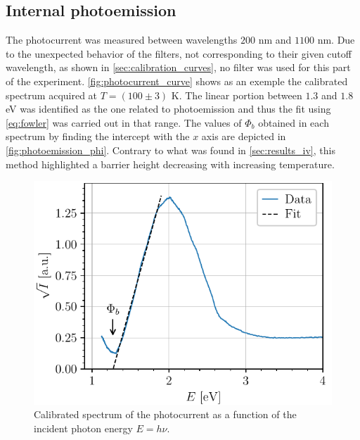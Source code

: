 \begin{figure}[htbp]
\begin{minipage}[t]{0.49\textwidth}
        \label{fig:richardson}
    \end{minipage}
\end{figure}

\subsection{Internal photoemission} \label{sec:results_photoemission}
The photocurrent was measured between wavelengths $200$ nm and $1100$ nm.
Due to the unexpected behavior of the filters, not corresponding to their given cutoff wavelength, as shown in \autoref{sec:calibration_curves}, no filter was used for this part of the experiment.
\autoref{fig:photocurrent_curve} shows as an exemple the calibrated spectrum acquired at $T = (100\pm3)$ K.
The linear portion between $1.3$ and $1.8$ eV was identified as the one related to photoemission and thus the fit using \autoref{eq:fowler} was carried out in that range.
The values of $\Phi_b$ obtained in each spectrum by finding the intercept with the $x$ axis are depicted in \autoref{fig:photoemission_phi}.
Contrary to what was found in  \autoref{sec:results_iv}, this method highlighted a barrier height decreasing with increasing temperature.
\begin{figure}[htbp]
    \centering
    \vspace{-0.2cm}
    \includegraphics[scale=1]{figures/photocurrent_curve.pdf}
    \caption{Calibrated spectrum of the photocurrent as a function of the incident photon energy $E=h\nu$.}
    \label{fig:photocurrent_curve}
    \vspace{-1.5cm}
\end{figure}
